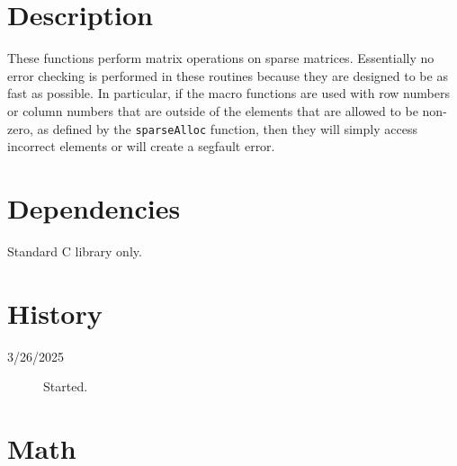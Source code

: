 \documentclass[11pt]{article}
\newcommand {\ttt} {\texttt}
\begin{document}
\section{Description}

These functions perform matrix operations on sparse matrices. Essentially no error checking is performed in these routines because they are designed to be as fast as possible. In particular, if the macro functions are used with row numbers or column numbers that are outside of the elements that are allowed to be non-zero, as defined by the \ttt{sparseAlloc} function, then they will simply access incorrect elements or will create a segfault error.


\section{Dependencies}
Standard C library only.

\section{History}
\begin{description}

\item[3/26/2025] Started.

\end{description}


\section{Math}
\end{document}
